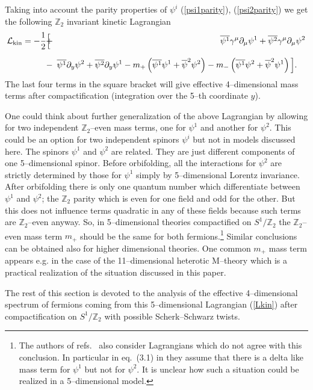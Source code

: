 \documentclass[a4paper,12pt]{article}
\def\pa{\partial}
\def\nn{\nonumber}
\def\ga{\gamma}
\def\cL{{\cal L}}
\def\ZZ{\mathbb Z}
\begin{document}
Taking into account the parity properties of $\psi^i$ 
(\ref{psi1parity}), (\ref{psi2parity}) we get the following
$\ZZ_2$ invariant kinetic Lagrangian
\begin{eqnarray}
\cL_{\rm kin}
=
-\frac12\Big[
&\!\!\!+\!\!\!&
\overline{\psi^1}\ga^\mu\pa_\mu\psi^1
+\overline{\psi^2}\ga^\mu\pa_\mu\psi^2
\nn\\[6pt]
&\!\!\!-\!\!\!&
\overline{\psi^1}\pa_y\psi^2
+\overline{\psi^2}\pa_y\psi^1
-m_+\left(\overline{\psi^1}\psi^1+\overline\psi^2\psi^2\right)
-m_-\left(\overline{\psi^1}\psi^2+\overline\psi^2\psi^1\right)
\Big]
.\ \ \ 
\label{Lkin}
\end{eqnarray}
The last four terms in the square bracket will give effective
4--dimensional mass terms after compactification (integration over the
5--th coordinate $y$). 


One could think about further generalization of the above Lagrangian
by allowing for two independent $\ZZ_2$--even mass terms, one for
$\psi^1$ and another for $\psi^2$. This could be an option for
two independent spinors $\psi^i$ but not in models discussed here. The
spinors $\psi^1$ and $\psi^2$ are related. They are just
different components of one 5--dimensional spinor. Before orbifolding,
all the interactions for $\psi^2$ are strictly determined by those for
$\psi^1$ simply by 5--dimensional Lorentz invariance. After
orbifolding there is only one quantum number which differentiate
between $\psi^1$ and $\psi^2$; the $\ZZ_2$ parity which is even for
one field and odd for the other. But this does not influence terms
quadratic in any of these fields because such terms are $\ZZ_2$--even
anyway. So, in 5--dimensional theories compactified on $S^1/\ZZ_2$ the
$\ZZ_2$--even mass term $m_+$ should be the same for both 
fermions.\footnote{
The authors of refs.\ \cite{Bagger:2001qi,Bagger:2001ep} also consider 
Lagrangians which do not agree with this conclusion. In particular in
eq.\ (3.1) in \cite{Bagger:2001ep} they assume that there is a delta
like mass term for $\psi^1$ but not for $\psi^2$. It is unclear how
such a situation could be realized in a 5--dimensional model.
}
Similar conclusions can be obtained also for higher dimensional
theories. One common $m_+$ mass term appears e.g. in the case of the
11--dimensional heterotic M--theory \cite{Meissner:1999ja} which is a
practical realization of the situation discussed in this paper.


The rest of this section is devoted to the analysis of the effective
4--dimensional spectrum of fermions coming from this 5--dimensional
Lagrangian (\ref{Lkin}) after compactification on $S^1/\ZZ_2$ with
possible Scherk--Schwarz twists.
\end{document}
